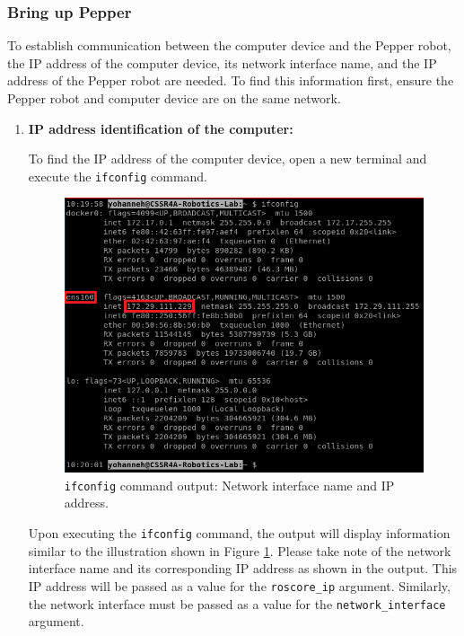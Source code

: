 \documentclass{CSSRforAfrica}
\begin{document}
{\subsubsection*{Bring up Pepper}
{
\label{bup}
To establish communication between the computer device and the Pepper robot, the IP address of the computer device, its network interface name, and the IP address of the Pepper robot are needed. To find this information first, ensure the Pepper robot and computer device are on the same network.

\begin{enumerate}
\item \textbf{IP address identification of the computer:}
{
\label{ipsystem}
To find the IP address of the computer device, open a new terminal and execute the \texttt{ifconfig} command.

\begin{figure}[!hbpt]
	\centering
	\includegraphics[scale=0.65]{images/Ifconfig.png}
	\caption{\texttt{ifconfig} command output: Network interface name and IP address.}
	\label{fig:ifconfig}
\end{figure}

Upon executing the \texttt{ifconfig} command, the output will display information similar to the illustration shown in Figure \ref{fig:ifconfig}. Please take note of the network interface name and its corresponding IP address as shown in the output. This IP address will be passed as a value for the \texttt{roscore\_ip} argument. Similarly, the network interface must be passed as a value for the \texttt{network\_interface} argument.} 


\end{enumerate}}}
\end{document}
